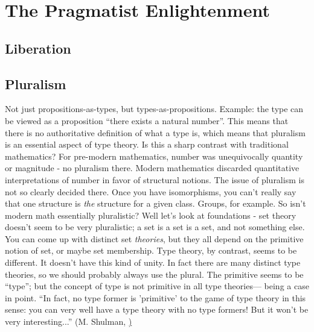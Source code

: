 \chapter{The Pragmatist Enlightenment}
\label{sect:enlightenment}

\section{Liberation}
\label{subs:liberation}



\section{Pluralism}
\label{subs:pluralism}

\begin{ednote}
  Not just propositions-as-types, but types-as-propositions.  Example:
  the type \N can be viewed as a proposition ``there exists a natural
  number''.  This means that there is no authoritative definition of
  what a type is, which means that pluralism is an essential aspect of
  type theory.  Is this a sharp contrast with traditional mathematics?
  For pre-modern mathematics, number was unequivocally quantity or
  magnitude - no pluralism there.  Modern mathematics discarded
  quantitative interpretations of number in favor of structural
  notions.  The issue of pluralism is not so clearly decided there.
  Once you have isomorphisms, you can't really say that one structure
  is \emph{the} structure for a given class.  Groups, for example.  So
  isn't modern math essentially pluralistic?  Well let's look at
  foundations - set theory doesn't seem to be very pluralistic; a set
  is a set is a set, and not something else.  You can come up with
  distinct set \emph{theories}, but they all depend on the primitive
  notion of set, or maybe set membership.  Type theory, by contrast,
  seems to be different.  It doesn't have this kind of unity.  In fact
  there are many distinct type theories, so we should probably always
  use the plural.  The primitive seems to be ``type''; but the concept
  of type is not primitive in all type theories---\HoTT{} being a case
  in point.  ``In fact, no type former is 'primitive' to the game of
  type theory in this sense: you can very well have a type theory with
  no type formers! But it won't be very interesting...'' (M. Shulman,
  \href{https://groups.google.com/d/msg/hott-amateurs/U1X0m4r6G-A/K5eeMSPXE5YJ})
\end{ednote}

